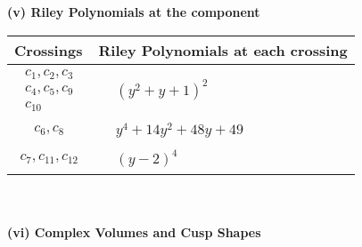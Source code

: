 \documentclass[1p]{elsarticle_modified}
\theoremstyle{definition}
\begin{document}
\newpage\renewcommand{\arraystretch}{1}
\flushleft \textbf{(v) Riley Polynomials at the component}\newline \\
\begin{tabular}{m{50pt}|m{274pt}}
Crossings & \hspace{64pt}Riley Polynomials at each crossing \\
\hline $$\begin{aligned}c_{1},c_{2},c_{3}\\c_{4},c_{5},c_{9}\\c_{10}\end{aligned}$$&$\begin{aligned}
&(y^2+y+1)^2
\end{aligned}$\\
\hline $$\begin{aligned}c_{6},c_{8}\end{aligned}$$&$\begin{aligned}
&y^4+14 y^2+48 y+49
\end{aligned}$\\
\hline $$\begin{aligned}c_{7},c_{11},c_{12}\end{aligned}$$&$\begin{aligned}
&(y-2)^4
\end{aligned}$\\
\hline
\end{tabular}\\~\\
\newpage\flushleft \textbf{(vi) Complex Volumes and Cusp Shapes}
\end{document}

